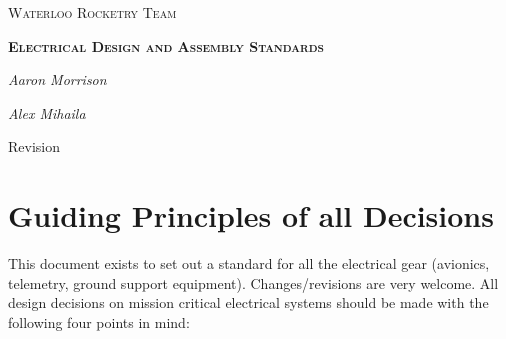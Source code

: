 \documentclass{article}
\date{\today}
\begin{document}
\begin{titlepage}
	\centering
	{\scshape\Huge Waterloo Rocketry Team \par}
	\vspace{1.5cm}
	{\scshape\bfseries\LARGE Electrical Design and Assembly Standards\par}
	\vspace{2cm}
	{\Large\itshape Aaron Morrison\par}
	{\Large\itshape Alex Mihaila\par}
	\vfill

	{\large \makeatletter\@date\par Revision \version}
    \par
\end{titlepage}

\section{Guiding Principles of all Decisions}
This document exists to set out a standard for all the electrical gear (avionics, telemetry, ground support equipment). Changes/revisions are very welcome. All design decisions on mission critical electrical systems should be made with the following four points in mind:
\end{document}
